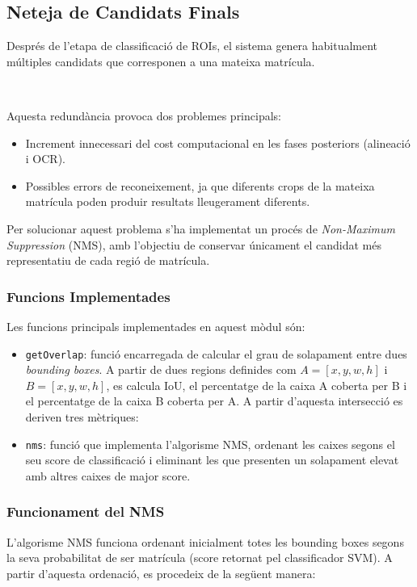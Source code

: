 
\subsection{Neteja de Candidats Finals}

Després de l'etapa de classificació de ROIs, el sistema genera habitualment múltiples candidats que corresponen a una mateixa matrícula.

\

Aquesta redundància provoca dos problemes principals:
\begin{itemize}
    \item Increment innecessari del cost computacional en les fases posteriors (alineació i OCR).
    \item Possibles errors de reconeixement, ja que diferents crops de la mateixa matrícula poden produir resultats lleugerament diferents.
\end{itemize}

Per solucionar aquest problema s'ha implementat un procés de \textit{Non-Maximum Suppression} (NMS), amb l'objectiu de conservar únicament el candidat més representatiu de cada regió de matrícula.

\subsubsection{Funcions Implementades}

Les funcions principals implementades en aquest mòdul són:
\begin{itemize}
     \item \texttt{getOverlap}: funció encarregada de calcular el grau de solapament entre dues \textit{bounding boxes}. A partir de dues regions definides com $A = [x, y, w, h]$ i $B = [x, y, w, h]$, es calcula IoU, el percentatge de la caixa A coberta per B i el percentatge de la caixa B coberta per A. 
    A partir d'aquesta intersecció es deriven tres mètriques:
    \item \texttt{nms}: funció que implementa l'algorisme NMS, ordenant les caixes segons el seu score de classificació i eliminant les que presenten un solapament elevat amb altres caixes de major score.
\end{itemize}

\subsubsection{Funcionament del NMS}

L'algorisme NMS funciona ordenant inicialment totes les bounding boxes segons la seva probabilitat de ser matrícula (score retornat pel classificador SVM). A partir d'aquesta ordenació, es procedeix de la següent manera:

